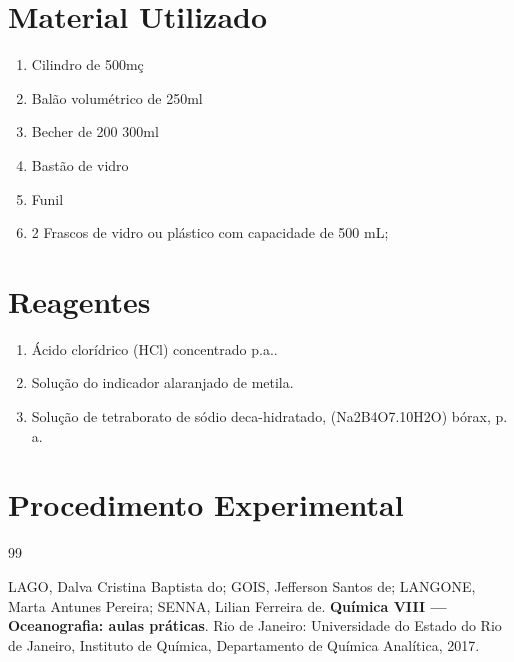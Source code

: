 \documentclass[a4paper,12pt]{article}
\begin{document}
\section{Material Utilizado}
\begin{enumerate}[label=\alph*.]
    \item Cilindro de 500mç
    \item Balão volumétrico de 250ml
    \item Becher de 200  300ml
    \item Bastão de vidro
    \item Funil
    \item 2 Frascos de vidro ou plástico com capacidade de 500 mL;
\end{enumerate}

\section{Reagentes}

\begin{enumerate}[label=\alph*.]
\item Ácido clorídrico (HCl) concentrado p.a..
\item Solução do indicador alaranjado de metila.
\item Solução de tetraborato de sódio deca-hidratado, (Na2B4O7.10H2O) bórax, p. a.
\end{enumerate}

\section{Procedimento Experimental}



\newpage
{}
{}
\begin{thebibliography}{99}

LAGO, Dalva Cristina Baptista do;
GOIS, Jefferson Santos de;
LANGONE, Marta Antunes Pereira;
SENNA, Lilian Ferreira de.
\textbf{Química VIII — Oceanografia: aulas práticas}.
Rio de Janeiro: Universidade do Estado do Rio de Janeiro, Instituto de Química, Departamento de Química Analítica, 2017.

\end{thebibliography}
\end{document}
